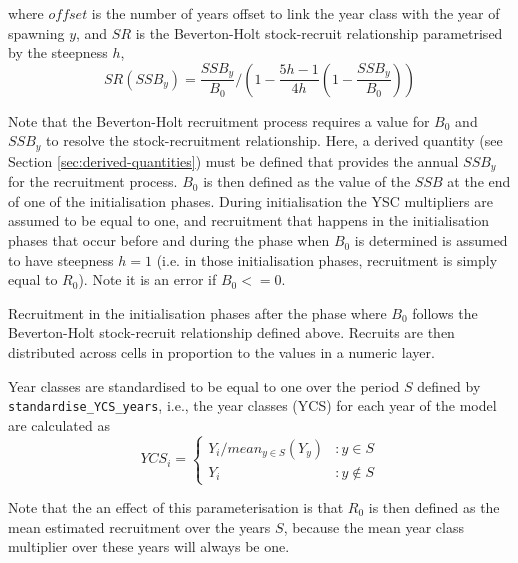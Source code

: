 where $offset$ is the number of years offset to link the year class with the year of spawning $y$, and $SR$ is the Beverton-Holt stock-recruit relationship parametrised by the steepness $h$,
\begin{equation}
SR(SSB_y) = \frac{SSB_y}{B_0} / \left( 1-\frac{5h-1}{4h} \left( 1-\frac{SSB_y}{B_0} \right) \right)
\end{equation}

Note that the Beverton-Holt recruitment process requires a value for $B_0$ and $SSB_y$ to resolve the stock-recruitment relationship. Here, a derived quantity (see Section \ref{sec:derived-quantities}) must be defined that provides the annual $SSB_y$ for the recruitment process. $B_0$ is then defined as the value of the $SSB$ at the end of one of the initialisation phases. During initialisation the YSC multipliers are assumed to be equal to one, and recruitment that happens in the initialisation phases that occur before and during the phase when $B_0$ is determined is assumed to have steepness $h=1$ (i.e. in those initialisation phases, recruitment is simply equal to $R_0$). Note it is an error if $B_0 <= 0$. 

Recruitment in the initialisation phases after the phase where $B_0$ follows the Beverton-Holt stock-recruit relationship defined above. Recruits are then distributed across cells in proportion to the values in a numeric layer. 

Year classes are standardised to be equal to one over the period $S$ defined by \texttt{standardise\_YCS\_years}, i.e., the year classes (YCS) for each year of the model are calculated as 
\begin{equation}
  YCS_i = \left\{
	   \begin{array}{ll}
     Y_i / mean_{y \in S}(Y_y) & : y \in S \\
	   Y_i & : y \notin S
  \end{array}
  \right.
\end{equation}

Note that the an effect of this parameterisation is that $R_0$ is then defined as the mean estimated recruitment over the years $S$, because the mean year class multiplier over these years will always be one.

